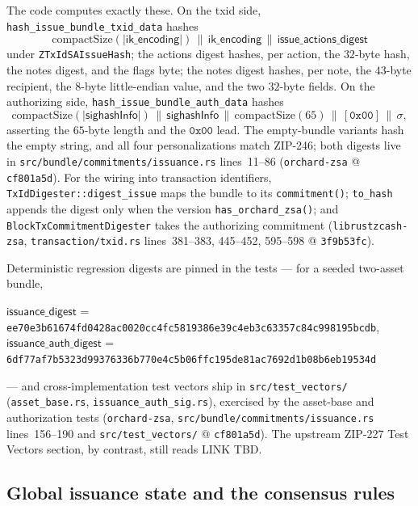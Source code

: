 \documentclass[11pt,a4paper]{article}
\theoremstyle{definition}
\begin{document}
The code computes exactly these. On the txid side,
\texttt{hash\_issue\_bundle\_txid\_data} hashes
\[
\mathrm{compactSize}(|\mathsf{ik\_encoding}|) \,\|\,
\mathsf{ik\_encoding} \,\|\, \mathsf{issue\_actions\_digest}
\]
under \texttt{ZTxIdSAIssueHash}; the actions digest hashes, per action,
the $32$-byte hash, the notes digest, and the flags byte; the notes
digest hashes, per note, the $43$-byte recipient, the $8$-byte
little-endian value, and the two $32$-byte fields. On the authorizing
side, \texttt{hash\_issue\_bundle\_auth\_data} hashes
\[
\mathrm{compactSize}(|\mathsf{sighashInfo}|) \,\|\,
\mathsf{sighashInfo} \,\|\, \mathrm{compactSize}(65) \,\|\,
[\mathtt{0x00}] \,\|\, \sigma,
\]
asserting the $65$-byte length and the $\mathtt{0x00}$ lead. The
empty-bundle variants hash the empty string, and all four
personalizations match ZIP-246; both digests live in
\texttt{src/bundle/commitments/\allowbreak issuance.rs} lines~11--86
(\texttt{orchard-zsa} @ \texttt{cf801a5d}). For the wiring into
transaction identifiers, \texttt{TxIdDigester::digest\_issue} maps the
bundle to its \texttt{commitment()}; \texttt{to\_hash} appends the
digest only when the version \texttt{has\_orchard\_zsa()}; and
\texttt{BlockTxCommitmentDigester} takes the authorizing commitment
(\texttt{librustzcash-zsa}, \texttt{transaction/txid.rs}
lines~381--383, 445--452, 595--598 @ \texttt{3f9b53fc}).

Deterministic regression digests are pinned in the tests --- for a seeded
two-asset bundle,
\begin{center}\small
$\mathsf{issuance\_digest}$ =
\texttt{ee70e3b61674fd0428ac0020cc4fc5819386e39c4eb3c63357c84c998195bcdb},\\
$\mathsf{issuance\_auth\_digest}$ =
\texttt{6df77af7b5323d99376336b770e4c5b06ffc195de81ac7692d1b08b6eb19534d}
\end{center}
--- and cross-implementation test vectors ship in
\texttt{src/test\_vectors/} (\texttt{asset\_base.rs},
\texttt{issuance\_auth\_sig.rs}), exercised by the asset-base and
authorization tests (\texttt{orchard-zsa},
\texttt{src/bundle/commitments/issuance.rs} lines~156--190 and
\texttt{src/test\_vectors/} @ \texttt{cf801a5d}). The upstream ZIP-227
Test Vectors section, by contrast, still reads LINK TBD.

\subsection{Global issuance state and the consensus rules}%
\label{sec:zsa-issuance-state}
\end{document}
